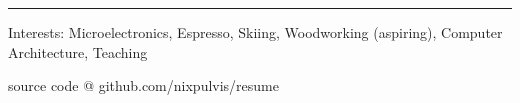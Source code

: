 \documentclass[10pt,letterpaper]{article}
\newenvironment{indentsection}[1]
{\begin{list}{}
  {\setlength{\leftmargin}{#1}} \item[]
}
{\end{list}}
\begin{document}
\hrule
\begin{indentsection}{\parindent}
\begin{description*}
\item[Interests:]
  Microelectronics, Espresso, Skiing, Woodworking (aspiring), Computer Architecture, Teaching
\end{description*}
\end{indentsection}

\begin{center}
\footnotesize source code @ github.com/nixpulvis/resume
\end{center}
\end{document}
